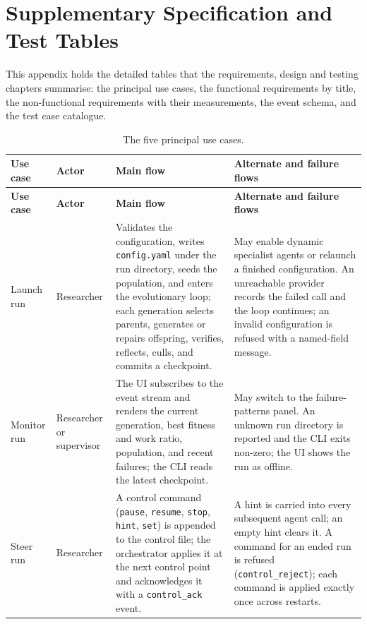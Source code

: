 \chapter{Supplementary Specification and Test Tables}
\label{app:tables}

This appendix holds the detailed tables that the requirements, design and testing
chapters summarise: the principal use cases, the functional requirements by title,
the non-functional requirements with their measurements, the event schema, and the
test case catalogue.

\begin{center}
\footnotesize
\setlength{\tabcolsep}{4pt}
\begin{longtable}{@{}>{\raggedright\arraybackslash}p{}>{\raggedright\arraybackslash}p{}>{\raggedright\arraybackslash}p{}>{\raggedright\arraybackslash}p{}@{}}
\caption{The five principal use cases.}\label{tab:usecases}\\
\toprule
\textbf{Use case} & \textbf{Actor} & \textbf{Main flow} & \textbf{Alternate and failure flows} \\
\midrule
\endfirsthead
\toprule
\textbf{Use case} & \textbf{Actor} & \textbf{Main flow} & \textbf{Alternate and failure flows} \\
\midrule
\endhead
\bottomrule
\endfoot
Launch run & Researcher & Validates the configuration, writes \texttt{config.yaml} under the run directory, seeds the population, and enters the evolutionary loop; each generation selects parents, generates or repairs offspring, verifies, reflects, culls, and commits a checkpoint. & May enable dynamic specialist agents or relaunch a finished configuration. An unreachable provider records the failed call and the loop continues; an invalid configuration is refused with a named-field message. \\
\addlinespace[2pt]
Monitor run & Researcher or supervisor & The UI subscribes to the event stream and renders the current generation, best fitness and work ratio, population, and recent failures; the CLI reads the latest checkpoint. & May switch to the failure-patterns panel. An unknown run directory is reported and the CLI exits non-zero; the UI shows the run as offline. \\
\addlinespace[2pt]
Steer run & Researcher & A control command (\texttt{pause}, \texttt{resume}, \texttt{stop}, \texttt{hint}, \texttt{set}) is appended to the control file; the orchestrator applies it at the next control point and acknowledges it with a \texttt{control\_ack} event. & A hint is carried into every subsequent agent call; an empty hint clears it. A command for an ended run is refused (\texttt{control\_reject}); each command is applied exactly once across restarts. \\

\end{longtable}
\end{center}
